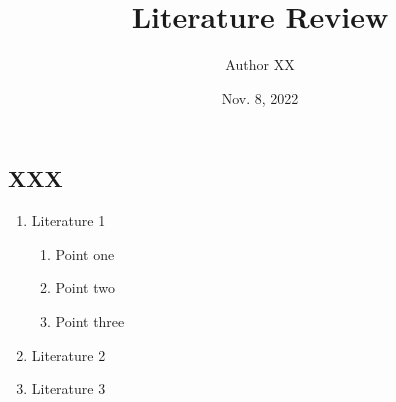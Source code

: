 \documentclass[11pt]{article}
\title{Literature Review}
\author{Author XX}
\date{Nov. 8, 2022}
\begin{document}
\maketitle



\subsection*{XXX}

\begin{enumerate}%
  \item Literature 1
  \begin{enumerate}
    \item Point one
    \item Point two
    \item Point three
  \end{enumerate}
  \item Literature 2
  \item Literature 3
\end{enumerate}
\end{document}

